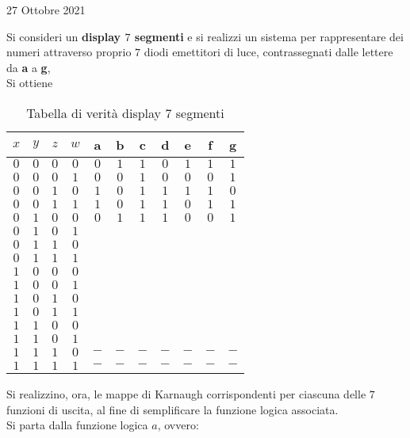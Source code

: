 \documentclass[a4paper]{extarticle}
\begin{document}
\newpage
\begin{center}
    27 Ottobre 2021
\end{center}
Si consideri un \textbf{display \(7\) segmenti} e si realizzi un sistema per rappresentare dei numeri attraverso proprio \(7\) diodi emettitori di luce, contrassegnati dalle lettere da \textbf{a} a \textbf{g},\\
Si ottiene

\begin{table}[H]
    \centering
    \begin{tabular}{cccc|ccccccc}
         $x$ & $y$ & $z$ & $w$ & a & b & c & d & e & f & g\\
         \hline
         $0$ & $0$ & $0$ & $0$ & $0$ & $1$ & $1$ & $0$ & $1$ & $1$ & $1$\\
         $0$ & $0$ & $0$ & $1$ & $0$ & $0$ & $1$ & $0$ & $0$ & $0$ & $1$ \\
         $0$ & $0$ & $1$ & $0$ & $1$ & $0$ & $1$ & $1$ & $1$ & $1$ & $0$ \\
         $0$ & $0$ & $1$ & $1$ & $1$ & $0$ & $1$ & $1$ & $0$ & $1$ & $1$ \\
         \hline
         $0$ & $1$ & $0$ & $0$ & $0$ & $1$ & $1$ & $1$ & $0$ & $0$ & $1$ \\
         $0$ & $1$ & $0$ & $1$\\
         $0$ & $1$ & $1$ & $0$\\
         $0$ & $1$ & $1$ & $1$\\
         \hline
         $1$ & $0$ & $0$ & $0$\\
         $1$ & $0$ & $0$ & $1$\\
         $1$ & $0$ & $1$ & $0$\\
         $1$ & $0$ & $1$ & $1$\\
         \hline
         $1$ & $1$ & $0$ & $0$\\
         $1$ & $1$ & $0$ & $1$\\
         $1$ & $1$ & $1$ & $0$ & $-$ & $-$ & $-$ & $-$ & $-$ & $-$ & $-$ \\
         $1$ & $1$ & $1$ & $1$ & $-$ & $-$ & $-$ & $-$ & $-$ & $-$ & $-$ \\
    \end{tabular}
    \caption{Tabella di verità display \(7\) segmenti}
    \label{tab:tabella_verita_display_7_segmenti}
\end{table}

\noindent
Si realizzino, ora, le mappe di Karnaugh corrispondenti per ciascuna delle \(7\) funzioni di uscita, al fine di semplificare la funzione logica associata.\\
Si parta dalla funzione logica \(a\), ovvero:
\end{document}
